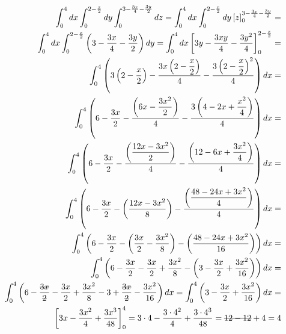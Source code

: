 \begin{enumerate}
	\begin{align*}
		 \int_0^4 dx \int_0^{2 - \frac{x}{2}} dy \int_0^{3 - \frac{3x}{4} - \frac{3y}{2}} dz = \int_0^4 dx \int_0^{2 - \frac{x}{2}} dy \left[z\right]_0^{3 - \frac{3x}{4} - \frac{3y}{2}} =\\ \int_0^4 dx \int_0^{2 - \frac{x}{2}} \left(3 - \frac{3x}{4} - \frac{3y}{2}\right) dy = \int_0^4 dx \left[3y - \frac{3xy}{4} - \frac{3y^2}{4}\right]_0^{2 - \frac{x}{2}} =\\ \int_0^4 \left(3\left(2 - \dfrac{x}{2}\right) - \frac{3x\left(2 - \dfrac{x}{2}\right)}{4} - \frac{3\left(2 - \dfrac{x}{2}\right)^2}{4}\right) dx =\\ \int_0^4 \left(6 - \dfrac{3x}{2} - \dfrac{\left(6x - \dfrac{3x^2}{2}\right)}{4} - \dfrac{3\left(4 - 2x + \dfrac{x^2}{4}\right)}{4}\right) dx =\\ \int_0^4 \left(6 - \dfrac{3x}{2} - \dfrac{\left(\dfrac{12x - 3x^2}{2}\right)}{4} - \dfrac{\left(12 - 6x + \dfrac{3x^2}{4}\right)}{4}\right) dx =\\ \int_0^4 \left(6 - \dfrac{3x}{2} - \left(\dfrac{12x - 3x^2}{8}\right) - \dfrac{\left(\dfrac{48 - 24x + 3x^2}{4}\right)}{4}\right) dx =\\ \int_0^4 \left(6 - \dfrac{3x}{2} - \left(\dfrac{3x}{2} - \dfrac{3x^2}{8}\right) - \left(\dfrac{48 - 24x + 3x^2}{16}\right)\right) dx =\\ \int_0^4 \left(6 - \dfrac{3x}{2} - \dfrac{3x}{2} + \dfrac{3x^2}{8} - \left(3 - \dfrac{3x}{2} + \dfrac{3x^2}{16}\right)\right) dx =\\ \int_0^4 \left(6 - \dfrac{\overstrike{3x}}{\overstrike{2}} - \dfrac{3x}{2} + \dfrac{3x^2}{8} - 3 + \dfrac{\overstrike{3x}}{\overstrike{2}} - \dfrac{3x^2}{16}\right) dx = \int_0^4 \left(3 - \dfrac{3x}{2} + \dfrac{3x^2}{16}\right) dx =\\ \left[3x - \dfrac{3x^2}{4} + \dfrac{3x^3}{48}\right]_0^4 = 3\cdot4 - \dfrac{3\cdot4^2}{4} + \dfrac{3\cdot4^3}{48} = \overstrike{12 - 12} + 4 = 4
	\end{align*}	
\end{enumerate}
